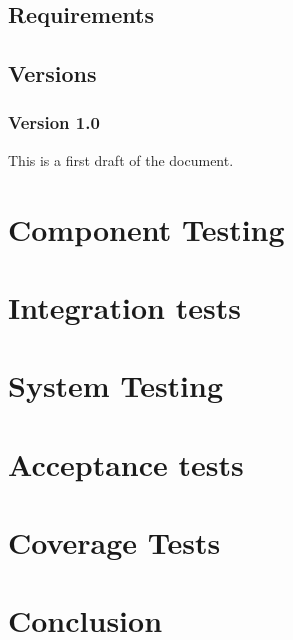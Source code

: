 \documentclass[signature]{deltares_report}
\begin{document}
\section{Requirements}
\label{sec:requirements}


\section{Versions}
\label{sec:Versions}

\subsection{Version 1.0}
\label{sec:Version}
This is a first draft of the document.

\chapter{Component Testing} 
\label{chapterUnitTest}


\chapter{Integration tests}
\label{chapterIntegrationTests}


\chapter{System Testing} 
\label{chapterSystemTest}


\chapter{Acceptance tests} 
\label{chapterAcceptanceTest}


\chapter{Coverage Tests} 
\label{chapterCoverage}


\chapter{Conclusion} 
\label{chapterConclusion}
\end{document}
